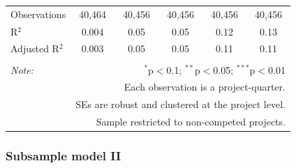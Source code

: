 \documentclass[
]{article}
\begin{document}
\begin{table}[H]
\begin{tabular}{@{\extracolsep{-2pt}}lccccc}
Observations & 40,464 & 40,456 & 40,456 & 40,456 & 40,456 \\ 
R$^{2}$ & 0.004 & 0.05 & 0.05 & 0.12 & 0.13 \\ 
Adjusted R$^{2}$ & 0.003 & 0.05 & 0.05 & 0.11 & 0.11 \\ 
\hline 
\hline \\[-1.8ex] 
\textit{Note:}  & \multicolumn{5}{r}{$^{*}$p$<$0.1; $^{**}$p$<$0.05; $^{***}$p$<$0.01} \\ 
 & \multicolumn{5}{r}{Each observation is a project-quarter.} \\ 
 & \multicolumn{5}{r}{SEs are robust and clustered at the project level.} \\ 
 & \multicolumn{5}{r}{Sample restricted to non-competed projects.} \\ 
\end{tabular} 
\end{table}

\hypertarget{subsample-model-ii}{%
\subsubsection{Subsample model II}\label{subsample-model-ii}}
\end{document}
